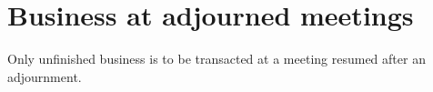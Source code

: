 \section{Business at adjourned meetings}

Only unfinished business is to be transacted at a meeting resumed after an adjournment. 